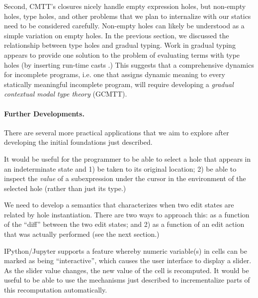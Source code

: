 Second, CMTT's closures nicely handle empty expression holes, but non-empty holes, type holes, and other problems that we plan to internalize with our statics need to be considered carefully. Non-empty holes can likely be understood as a simple variation on empty holes. In the previous section, we discussed the relationship between type holes and gradual typing. Work in gradual typing appears to provide one solution to the problem of evaluating terms with type holes (by inserting run-time casts \cite{Siek06a}.) This suggests that a comprehensive dynamics for incomplete programs, i.e. one that assigns dynamic meaning to every statically meaningful incomplete program, will require developing a \emph{gradual contextual modal type theory} (GCMTT).

\paragraph{Further Developments.} There are several more practical applications that we aim to explore after developing the initial foundations just described.

It would be useful for the programmer to be able to select a hole that appears in an indeterminate state and 1) be taken to its original location; 2) be able to inspect the \emph{value} of a subexpression under the cursor in the environment of the selected hole (rather than just its type.)

We need to develop a semantics that characterizes when two edit states are related by hole instantiation. There are two ways to approach this: as a function of the ``diff'' between the two edit states; and 2) as a function of an edit action that was actually performed (see the next section.)

IPython/Jupyter \cite{Perez:2007:ISI:1251563.1251831} supports a feature whereby numeric variable(s) in cells can be marked as being ``interactive'', which causes the user interface to display a slider. As the slider value changes, the new value of the cell is recomputed. It would be useful to be able to use the mechanisms just described to incrementalize parts of this recomputation automatically.



